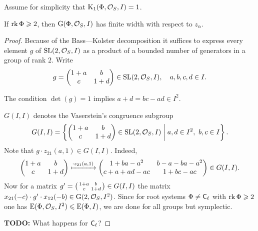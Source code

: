 Assume for simplicity that $\operatorname{K}_1(\Phi,\mathcal{O}_S,I)=1$.
\begin{lemma}
If $\operatorname{rk}\Phi\geqslant2$, then $\operatorname{G}(\Phi,\mathcal{O}_S,I)$ has finite width with respect to $z_\alpha$.
\end{lemma}
\begin{proof}
Because of the Bass---Kolster decomposition it suffices to express every element $g$ of $\operatorname{SL}(2,\mathcal{O}_S,I)$ as a product of a bounded number of generators in a group of rank $2$. Write
\[ g=\begin{pmatrix}1+a & b \\ c & 1+d\end{pmatrix}\in\operatorname{SL}(2,\mathcal{O}_S,I),\quad a,b,c,d\in I. \]

The condition $\det(g)=1$ implies $a+d=bc-ad\in I^2$.

$G(I,I)$ denotes the Vaserstein's congruence subgroup
\[ G(I,I)=\left\{ \begin{pmatrix}1+a & b \\ c & 1+d\end{pmatrix}\in\SL(2,\mathcal{O}_S,I)\;\middle|\; a,d\in I^2,\ b,c\in I \right\}. \]
Note that $g\cdot z_{21}(a,1)\in G(I,I)$. Indeed,
\[
\begin{pmatrix}
1+a & b \\ c & 1+d
\end{pmatrix} \xmapsto{\cdot z_{21}(a,1)}
\begin{pmatrix}
1+ba-a^2 & b-a-ba-a^2 \\ c+a+ad-ac & 1+bc-ac
\end{pmatrix} \in G(I,I).
\]
Now for a matrix $g'=\begin{psmallmatrix}1+a & b \\ c & 1+d\end{psmallmatrix}\in G(I,I)$ the matrix $x_{21}(-c)\cdot g'\cdot x_{12}(-b)\in\operatorname{G}(2,\mathcal{O}_S,I^2)$. Since for root systems $\Phi\neq\mathsf{C}_\ell$ with $\operatorname{rk}\Phi\geqslant2$ one has $\operatorname{E}(\Phi,\mathcal{O}_S,I^2)\leqslant\operatorname{E}(\Phi,I)$, we are done for all groups but symplectic.

\textbf{TODO:} What happens for $\mathsf{C}_\ell$?
\end{proof}